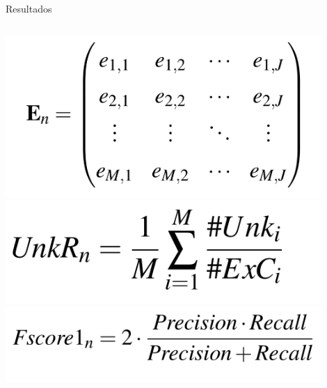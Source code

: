 \documentclass[aspectratio=1610,10pt]{beamer}
\begin{document}
\begin{frame}[fragile]{Resultados}
  \begin{columns}[T,onlytextwidth]
    \includegraphics[width=0.9\textwidth]{figuras/eq-matrix.png}
    \includegraphics[width=0.9\textwidth]{figuras/eq-unk.png}
    \includegraphics[width=0.9\textwidth]{figuras/eq-fscore1.png}
  \end{columns}
\end{frame}
\end{document}
